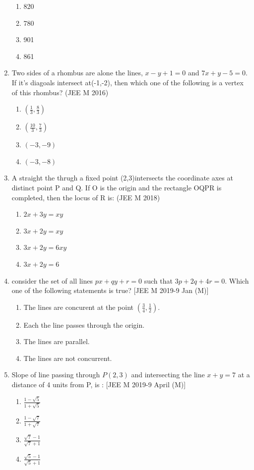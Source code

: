 \documentclass[12pt]{article}
\providecommand{\brak}[1]{\ensuremath{\left(#1\right)}}
\begin{document}
\begin{enumerate}
\begin{enumerate}
\item 820 
\item 780 
\item 901 
\item 861
\end{enumerate}
\item Two sides  of a rhombus are alone the lines, $x-y+1=0$ and $7x+y-5=0$. If it's diagoals intersect at(-1,-2), then which one of the following is a vertex of this rhombus? (JEE M 2016)
\begin{enumerate}
\item $\brak{\frac{1}{3},\frac{8}{3}}$ 
\item $\brak{\frac{10}{3},\frac{7}{3}}$ 
\item $(-3,-9)$ 
\item $(-3,-8)$
\end{enumerate}
\item A straight the thrugh a fixed point (2,3)intersects the coordinate axes at distinct point P  and Q. If O is the origin and the rectangle OQPR is completed, then the locus of R is: (JEE M 2018)
\begin{enumerate}
\item $2x+3y=xy$ 
\item $3x+2y=xy$ 
\item $3x+2y=6xy$ 
\item $3x+2y=6$
\end{enumerate}
\item consider the set of all lines $px+qy+r=0$ such that $3p+2q+4r=0$. Which one of the following statements is true? [JEE M 2019-9 Jan (M)]
\begin{enumerate}
\item The lines are concurent at the point $\brak{\frac{3}{4},\frac{1}{2}} $.
\item Each the line passes through the origin.
\item The lines are parallel.
\item The lines are not concurrent.
\end{enumerate}
\item Slope of line passing through $P(2,3)$ and intersecting the line $x+y=7$ at a distance of 4 units from  P,  is : [JEE M 2019-9 April (M)]
\begin{enumerate}
\item $\frac{1-\sqrt{5}}{1+\sqrt{5}}$
\item $\frac{1-\sqrt{7}}{1+\sqrt{7}}$
\item $\frac{\sqrt{7}-1}{\sqrt{7}+1}$
\item $\frac{\sqrt{5}-1}{\sqrt{5}+1}$
\end{enumerate}
\end{enumerate}
\end{document}
